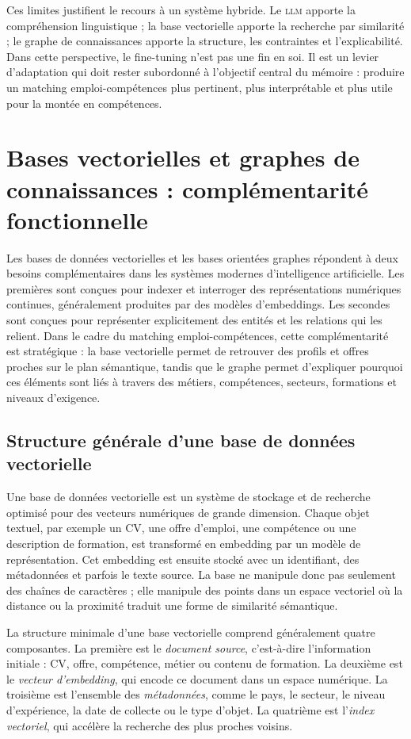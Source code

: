 \documentclass[12pt,twoside]{report}
\newcommand{\LLM}{\textsc{llm}}
\begin{document}
Ces limites justifient le recours à un système hybride. Le \LLM{} apporte la compréhension linguistique ; la base vectorielle apporte la recherche par similarité ; le graphe de connaissances apporte la structure, les contraintes et l'explicabilité. Dans cette perspective, le fine-tuning n'est pas une fin en soi. Il est un levier d'adaptation qui doit rester subordonné à l'objectif central du mémoire : produire un matching emploi-compétences plus pertinent, plus interprétable et plus utile pour la montée en compétences.


\section{Bases vectorielles et graphes de connaissances : complémentarité fonctionnelle}
Les bases de données vectorielles et les bases orientées graphes répondent à deux besoins complémentaires dans les systèmes modernes d'intelligence artificielle. Les premières sont conçues pour indexer et interroger des représentations numériques continues, généralement produites par des modèles d'embeddings. Les secondes sont conçues pour représenter explicitement des entités et les relations qui les relient. Dans le cadre du matching emploi-compétences, cette complémentarité est stratégique : la base vectorielle permet de retrouver des profils et offres proches sur le plan sémantique, tandis que le graphe permet d'expliquer pourquoi ces éléments sont liés à travers des métiers, compétences, secteurs, formations et niveaux d'exigence.

\subsection{Structure générale d'une base de données vectorielle}
Une base de données vectorielle est un système de stockage et de recherche optimisé pour des vecteurs numériques de grande dimension. Chaque objet textuel, par exemple un CV, une offre d'emploi, une compétence ou une description de formation, est transformé en embedding par un modèle de représentation. Cet embedding est ensuite stocké avec un identifiant, des métadonnées et parfois le texte source. La base ne manipule donc pas seulement des chaînes de caractères ; elle manipule des points dans un espace vectoriel où la distance ou la proximité traduit une forme de similarité sémantique.

La structure minimale d'une base vectorielle comprend généralement quatre composantes. La première est le \textit{document source}, c'est-à-dire l'information initiale : CV, offre, compétence, métier ou contenu de formation. La deuxième est le \textit{vecteur d'embedding}, qui encode ce document dans un espace numérique. La troisième est l'ensemble des \textit{métadonnées}, comme le pays, le secteur, le niveau d'expérience, la date de collecte ou le type d'objet. La quatrième est l'\textit{index vectoriel}, qui accélère la recherche des plus proches voisins.
\end{document}
